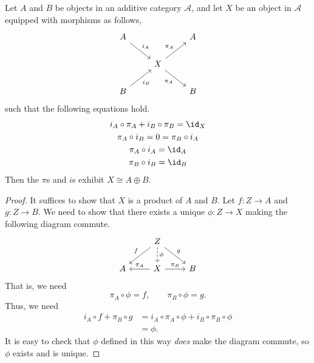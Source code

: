 \documentclass[main.tex]{subfiles}
\begin{document}
\begin{lemma}
  \label{lemma:conditions_for_direct_sum}
  Let $A$ and $B$ be objects in an additive category $\mathcal{A}$, and let $X$ be an object in $\mathcal{A}$ equipped with morphisms as follows,
  \begin{equation*}
    \begin{tikzcd}
      A
      \arrow[dr, "i_{A}"]
      && A
      \\
      & X
      \arrow[ur, "\pi_{A}"]
      \arrow[dr, swap, "\pi_{A}"]
      \\
      B
      \arrow[ur, swap, "i_{B}"]
      && B
    \end{tikzcd}
  \end{equation*}
  such that the following equations hold.
  \begin{gather*}
    i_{A} \circ \pi_{A} + i_{B} \circ \pi_{B} = \id_{X} \\
    \pi_{A} \circ i_{B} = 0 = \pi_{B} \circ i_{A} \\
    \pi_{A} \circ i_{A} = \id_{A} \\
    \pi_{B} \circ i_{B} = \id_{B} \\
  \end{gather*}
  Then the $\pi$s and $i$s exhibit $X \cong A \oplus B$.
\end{lemma}
\begin{proof}
  It suffices to show that $X$ is a product of $A$ and $B$. Let $f\colon Z \to A$ and $g\colon Z \to B$. We need to show that there exists a unique $\phi\colon Z \to X$ making the following diagram commute.
  \begin{equation*}
    \begin{tikzcd}
      & Z
      \arrow[dl, swap, "f"]
      \arrow[d, dashed, "\phi"]
      \arrow[dr, "g"]
      \\
      A
      & X
      \arrow[l, swap, "\pi_{A}"]
      \arrow[r, "\pi_{B}"]
      & B
    \end{tikzcd}
  \end{equation*}
  That is, we need
  \begin{equation*}
    \pi_{A} \circ \phi = f,\qquad \pi_{B} \circ \phi = g.
  \end{equation*}
  Thus, we need
  \begin{align*}
    i_{A} \circ f + \pi_{B} \circ g  &= i_{A} \circ \pi_{A} \circ \phi + i_{B} \circ \pi_{B} \circ \phi \\
    &= \phi.
  \end{align*}
  It is easy to check that $\phi$ defined in this way \emph{does} make the diagram commute, so $\phi$ exists and is unique.
\end{proof}
\end{document}
